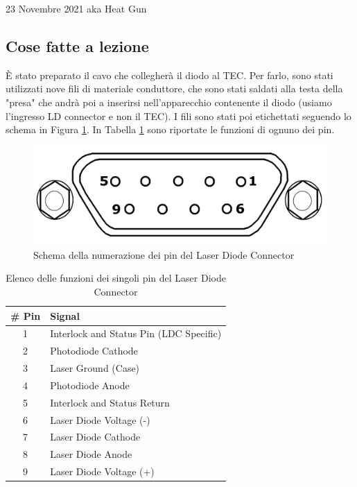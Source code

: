\documentclass{article}
\numberwithin{equation}{section}
\begin{document}
\begin{section}{23 Novembre 2021 aka Heat Gun}
\subsection{Cose fatte a lezione}
È stato preparato il cavo che collegherà il diodo al TEC. Per farlo, sono stati utilizzati nove fili di materiale conduttore, che sono stati saldati alla testa della "presa" che andrà poi a inserirsi nell'apparecchio contenente il diodo (usiamo l'ingresso LD connector e non il TEC). I fili sono stati poi etichettati seguendo lo schema in Figura \ref{fig:pin}. In Tabella \ref{tab:pinfunction} sono riportate le funzioni di ognuno dei pin. 
\begin{figure}[h]
    \centering
    \includegraphics[scale=0.3]{images/pin_scheme.png}
    \caption{Schema della numerazione dei pin del Laser Diode Connector}
    \label{fig:pin}
\end{figure}

\begin{table}[htpb]
    \centering
    \begin{tabular}{c|l}
        \# Pin &	Signal \\
        \hline
        1 &	Interlock and Status Pin (LDC Specific) \\
        2 &	Photodiode Cathode \\
        3 &	Laser Ground (Case) \\
        4 &	Photodiode Anode \\
        5 &	Interlock and Status Return \\
        6 &	Laser Diode Voltage (-) \\
        7 &	Laser Diode Cathode \\
        8 &	Laser Diode Anode \\
        9 &	Laser Diode Voltage (+)
    \end{tabular}
    \caption{Elenco delle funzioni dei singoli pin del Laser Diode Connector}
    \label{tab:pinfunction}
\end{table}


\end{section}
\end{document}
